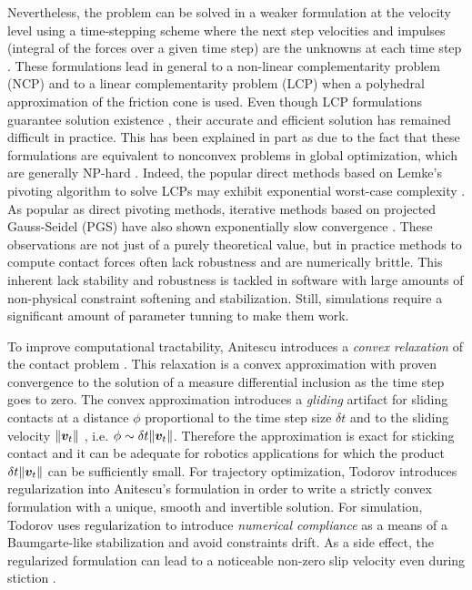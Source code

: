 Nevertheless, the problem can be solved in a weaker formulation at the velocity
level using a time-stepping scheme where the next step velocities and impulses
(integral of the forces over a given time step) are the unknowns at each time
step \cite{bib:stewart1996implicit, bib:anitescu1997}. These formulations lead
in general to a non-linear complementarity problem (NCP) and to a linear
complementarity problem (LCP) when a polyhedral approximation of the friction
cone is used. Even though LCP formulations guarantee solution existence
\cite{bib:anitescu1997, bib:stewart1998convergence}, their accurate and
efficient solution has remained difficult in practice. This has been explained
in part as due to the fact that these formulations are equivalent to nonconvex problems
in global optimization, which are generally NP-hard \cite{bib:Kaufman2008}.
Indeed, the popular direct methods based on Lemke's pivoting algorithm to solve
LCPs may exhibit exponential worst-case complexity \cite{bib:baraff1994fast}. As
popular as direct pivoting methods, iterative methods based on projected
Gauss-Seidel (PGS) \cite{bib:duriez2006_realistic_haptic_rendering, bib:bullet}
have also shown exponentially slow convergence \cite{bib:erleben2007velocity}.
These observations are not just of a purely theoretical value, but in practice
methods to compute contact forces often lack robustness and are numerically
brittle. This inherent lack stability and robustness is tackled in software with
large amounts of non-physical constraint softening and stabilization. Still,
simulations require a significant amount of parameter tunning to make them work.

To improve computational tractability, Anitescu introduces a \textit{convex
relaxation} of the contact problem \cite{bib:anitescu2006}. This relaxation is a
convex approximation with proven convergence to the solution of a measure
differential inclusion as the time step goes to zero. The convex approximation
introduces a \emph{gliding} artifact for sliding contacts at a distance $\phi$
proportional to the time step size $\delta t$ and to the sliding velocity
$\Vert{\bm{v}}_t\Vert$ \cite{bib:mazhar2014}, i.e. $\phi\sim \delta
t\Vert{\bm{v}}_t\Vert$. Therefore the approximation is exact for sticking contact
and it can be adequate for robotics applications for which the product $\delta
t\Vert{\bm{v}}_t\Vert$ can be sufficiently small. For trajectory optimization,
Todorov \cite{bib:todorov2011} introduces regularization into Anitescu's
formulation in order to write a strictly convex formulation with a unique,
smooth and invertible solution. For simulation, Todorov \cite{bib:todorov2014}
uses regularization to introduce \emph{numerical compliance} as a means of a
Baumgarte-like stabilization and avoid constraints drift. As a side effect, the
regularized formulation can lead to a noticeable non-zero slip velocity even
during stiction \cite{bib:simbenchmark}.


